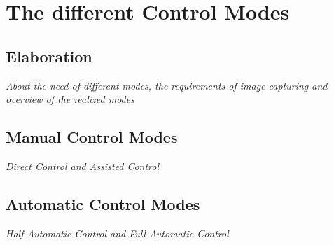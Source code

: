 \chapter{The different Control Modes}
\label{cha:DifferentControlModes}
\section{Elaboration}
\label{sec:elaboration}
\textit{About the need of different modes, the requirements of image capturing and overview of the realized modes}
\section{Manual Control Modes}
\label{manualControlModes}
\textit{Direct Control and Assisted Control}
\section{Automatic Control Modes}
\label{automaticControlModes}
\textit{Half Automatic Control and Full Automatic Control}